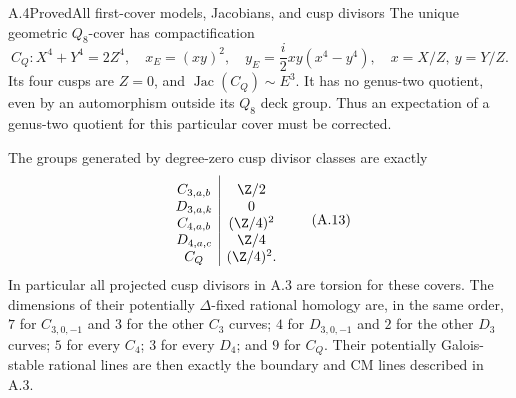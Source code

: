 \begin{statement}{A.4}{Proved}{All first-cover models, Jacobians, and cusp divisors}
The unique geometric $Q_8$-cover has compactification
\[
 C_Q:X^4+Y^4=2Z^4,
\quad x_E=(xy)^2,\quad y_E=\frac{i}{2}xy(x^4-y^4),
\quad x=X/Z,\ y=Y/Z.                                            \tag{A.12}
\]
Its four cusps are $Z=0$, and $\operatorname{Jac}(C_Q)\sim E^3$.
It has no genus-two quotient, even by an automorphism outside its
$Q_8$ deck group. Thus an expectation of a genus-two quotient for
this particular cover must be corrected.

The groups generated by degree-zero cusp divisor classes are exactly
\[
\begin{array}{c|c}
 C_{3,a,b}&\Z/2\rule{0pt}{13pt}\\
 D_{3,a,k}&0\\
 C_{4,a,b}&(\Z/4)^2\\
 D_{4,a,c}&\Z/4\\
 C_Q&(\Z/4)^2.
\end{array}                                                     \tag{A.13}
\]
In particular all projected cusp divisors in A.3 are torsion for
these covers. The dimensions of their potentially $\Delta$-fixed
rational homology are, in the same order, $7$ for $C_{3,0,-1}$ and
$3$ for the other $C_3$ curves; $4$ for $D_{3,0,-1}$ and $2$ for
the other $D_3$ curves; $5$ for every $C_4$; $3$ for every $D_4$;
and $9$ for $C_Q$. Their potentially Galois-stable rational lines
are then exactly the boundary and CM lines described in A.3.
\end{statement}
